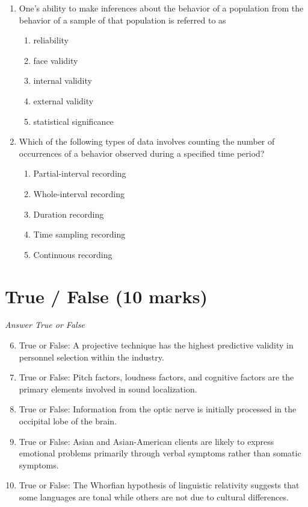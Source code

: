 \documentclass[12pt]{article}
\begin{document}
\begin{enumerate}[label=\arabic*.]
\begin{enumerate}[label=(\alph*)]
    \item Mean: 12.5 years, Median: 12, Mode: 11, Range: 10
\end{enumerate}
\item One's ability to make inferences about the behavior of a population from the behavior of a sample of that population is referred to as
\begin{enumerate}[label=(\alph*)]
    \item reliability
    \item face validity
    \item internal validity
    \item external validity
    \item statistical significance
\end{enumerate}
\item Which of the following types of data involves counting the number of occurrences of a behavior observed during a specified time period?
\begin{enumerate}[label=(\alph*)]
    \item Partial-interval recording
    \item Whole-interval recording
    \item Duration recording
    \item Time sampling recording
    \item Continuous recording
\end{enumerate}
\end{enumerate}

\section*{True / False (10 marks)}
\textit{Answer True or False}
\begin{enumerate}[label=\arabic*.]
\setcounter{enumi}{5}
\item True or False: A projective technique has the highest predictive validity in personnel selection within the industry.
\item True or False: Pitch factors, loudness factors, and cognitive factors are the primary elements involved in sound localization.
\item True or False: Information from the optic nerve is initially processed in the occipital lobe of the brain.
\item True or False: Asian and Asian-American clients are likely to express emotional problems primarily through verbal symptoms rather than somatic symptoms.
\item True or False: The Whorfian hypothesis of linguistic relativity suggests that some languages are tonal while others are not due to cultural differences.
\end{enumerate}
\end{document}
